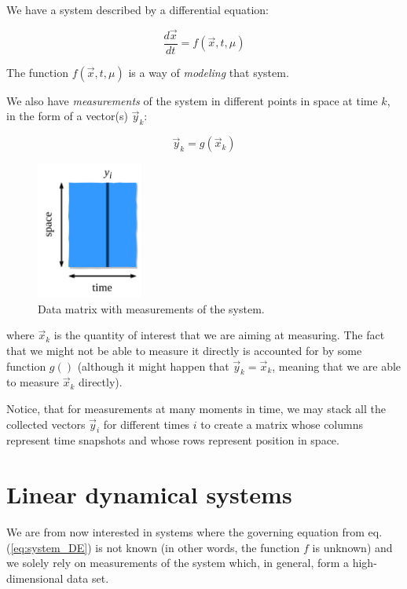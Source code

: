 \documentclass[10pt,twocolumn]{article}
\begin{document}
We have a system described by a differential equation:

\begin{equation} \label{eq:system_DE}
\frac{d \vec{x}}{dt} = f(\vec{x}, t, \mu)
\end{equation}

The function $f(\vec{x}, t, \mu)$ is a way of \textit{modeling} that system.

We also have \textit{measurements} of the system in different points in space at time $k$, in the form of a vector(s) $\vec{y}_k$:

\begin{equation}
\vec{y}_k = g(\vec{x}_k)
\end{equation}

\begin{figure}
\centering\includegraphics[width=3.5cm]{data-matrix.png}
\caption{Data matrix with measurements of the system.}
\label{fig:data-matrix}
\end{figure}

where $\vec{x}_k$ is the quantity of interest that we are aiming at measuring. The fact that we might not be able to measure it directly is accounted for by some function $g()$ (although it might happen that $\vec{y}_k = \vec{x}_k$, meaning that we are able to measure $\vec{x}_k$ directly).

Notice, that for measurements at many moments in time, we may stack all the collected vectors $\vec{y}_i$ for different times $i$ to create a matrix whose columns represent time snapshots and whose rows represent position in space.

\section{Linear dynamical systems}

We are from now interested in systems where the governing equation from eq.(\ref{eq:system_DE}) is not known (in other words, the function $f$ is unknown) and we solely rely on measurements of the system which, in general, form a high-dimensional data set.
\end{document}
